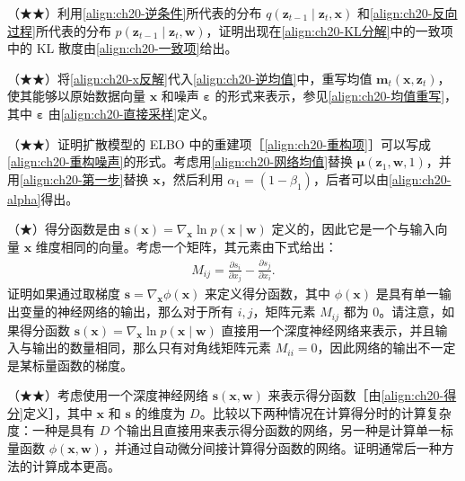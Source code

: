\documentclass[../../main.tex]{subfiles}
\begin{document}
\begin{exercise}\label{exercise:ch20-11}
（★★）利用\eqref{align:ch20-逆条件}所代表的分布 $q(\bm{z}_{t-1}\mid\bm{z}_t,\bm{x})$ 和\eqref{align:ch20-反向过程}所代表的分布 $p(\bm{z}_{t-1}\mid\bm{z}_t,\bm{w})$，证明出现在\eqref{align:ch20-KL分解}中的一致项中的 KL 散度由\eqref{align:ch20-一致项}给出。
\end{exercise}

\begin{exercise}\label{exercise:ch20-12}
（★★）将\eqref{align:ch20-x反解}代入\eqref{align:ch20-逆均值}中，重写均值 $\bm{m}_t(\bm{x},\bm{z}_t)$，使其能够以原始数据向量 $\bm{x}$ 和噪声 $\bm{\varepsilon}$ 的形式来表示，参见\eqref{align:ch20-均值重写}，其中 $\bm{\varepsilon}$ 由\eqref{align:ch20-直接采样}定义。
\end{exercise}

\begin{exercise}\label{exercise:ch20-13}
（★★）证明扩散模型的 ELBO 中的重建项［\eqref{align:ch20-重构项}］可以写成\eqref{align:ch20-重构噪声}的形式。考虑用\eqref{align:ch20-网络均值}替换 $\bm{\mu}(\bm{z}_1,\bm{w},1)$，并用\eqref{align:ch20-第一步}替换 $\bm{x}$，然后利用 $\alpha_1=(1-\beta_1)$，后者可以由\eqref{align:ch20-alpha}得出。
\end{exercise}

\begin{exercise}\label{exercise:ch20-14}
（★）得分函数是由 $\bm{s}(\bm{x})=\nabla_{\bm{x}}\ln p(\bm{x}\mid\bm{w})$ 定义的，因此它是一个与输入向量 $\bm{x}$ 维度相同的向量。考虑一个矩阵，其元素由下式给出：
\begin{align}
M_{ij}=\frac{\partial s_i}{\partial x_j}-\frac{\partial s_j}{\partial x_i}.
\label{align:ch20-反对称}
\end{align}
证明如果通过取梯度 $\bm{s}=\nabla_{\bm{x}}\phi(\bm{x})$ 来定义得分函数，其中 $\phi(\bm{x})$ 是具有单一输出变量的神经网络的输出，那么对于所有 $i,j$，矩阵元素 $M_{ij}$ 都为 $0$。请注意，如果得分函数 $\bm{s}(\bm{x})=\nabla_{\bm{x}}\ln p(\bm{x}\mid\bm{w})$ 直接用一个深度神经网络来表示，并且输入与输出的数量相同，那么只有对角线矩阵元素 $M_{ii}=0$，因此网络的输出不一定是某标量函数的梯度。
\end{exercise}

\begin{exercise}\label{exercise:ch20-15}
（★★）考虑使用一个深度神经网络 $\bm{s}(\bm{x},\bm{w})$ 来表示得分函数［由\eqref{align:ch20-得分}定义］，其中 $\bm{x}$ 和 $\bm{s}$ 的维度为 $D$。比较以下两种情况在计算得分时的计算复杂度：一种是具有 $D$ 个输出且直接用来表示得分函数的网络，另一种是计算单一标量函数 $\phi(\bm{x},\bm{w})$，并通过自动微分间接计算得分函数的网络。证明通常后一种方法的计算成本更高。
\end{exercise}
\end{document}
